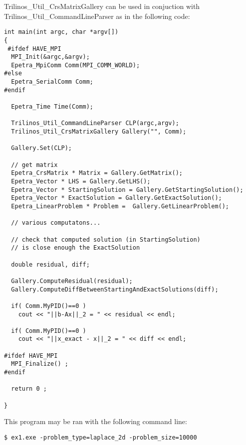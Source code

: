 \medskip

Trilinos\_Util\_CrsMatrixGallery can be used in conjuction with
Trilinos\_Util\_CommandLineParser as in the following code:
\begin{verbatim}
int main(int argc, char *argv[]) 
{
 #ifdef HAVE_MPI
  MPI_Init(&argc,&argv);
  Epetra_MpiComm Comm(MPI_COMM_WORLD);
#else
  Epetra_SerialComm Comm;
#endif

  Epetra_Time Time(Comm);

  Trilinos_Util_CommandLineParser CLP(argc,argv);
  Trilinos_Util_CrsMatrixGallery Gallery("", Comm);

  Gallery.Set(CLP);

  // get matrix
  Epetra_CrsMatrix * Matrix = Gallery.GetMatrix();
  Epetra_Vector * LHS = Gallery.GetLHS();
  Epetra_Vector * StartingSolution = Gallery.GetStartingSolution();
  Epetra_Vector * ExactSolution = Gallery.GetExactSolution();
  Epetra_LinearProblem * Problem =  Gallery.GetLinearProblem();

  // various computatons...

  // check that computed solution (in StartingSolution) 
  // is close enough the ExactSolution

  double residual, diff;

  Gallery.ComputeResidual(residual);
  Gallery.ComputeDiffBetweenStartingAndExactSolutions(diff);
  
  if( Comm.MyPID()==0 ) 
    cout << "||b-Ax||_2 = " << residual << endl;

  if( Comm.MyPID()==0 ) 
    cout << "||x_exact - x||_2 = " << diff << endl;

#ifdef HAVE_MPI
  MPI_Finalize() ;
#endif

  return 0 ;

}
\end{verbatim}
This program may be ran with the following command line:
\begin{verbatim}
$ ex1.exe -problem_type=laplace_2d -problem_size=10000
\end{verbatim}